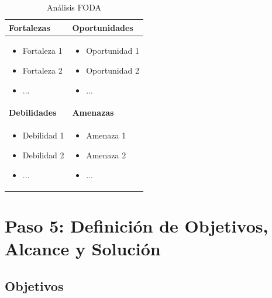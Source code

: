 \documentclass[12pt,letterpaper]{report}
\begin{document}
\begin{table}[H]
    \centering
    \begin{tabular}{|p{}|p{}|}
        \hline
        \textbf{Fortalezas} & \textbf{Oportunidades} \\
        \hline
        \begin{itemize}
            \item Fortaleza 1
            \item Fortaleza 2
            \item ...
        \end{itemize} & 
        \begin{itemize}
            \item Oportunidad 1
            \item Oportunidad 2
            \item ...
        \end{itemize} \\
        \hline
        \textbf{Debilidades} & \textbf{Amenazas} \\
        \hline
        \begin{itemize}
            \item Debilidad 1
            \item Debilidad 2
            \item ...
        \end{itemize} & 
        \begin{itemize}
            \item Amenaza 1
            \item Amenaza 2
            \item ...
        \end{itemize} \\
        \hline
    \end{tabular}
    \caption{Análisis FODA}
\end{table}

\section{Paso 5: Definición de Objetivos, Alcance y Solución}

\subsection{Objetivos}
\end{document}
